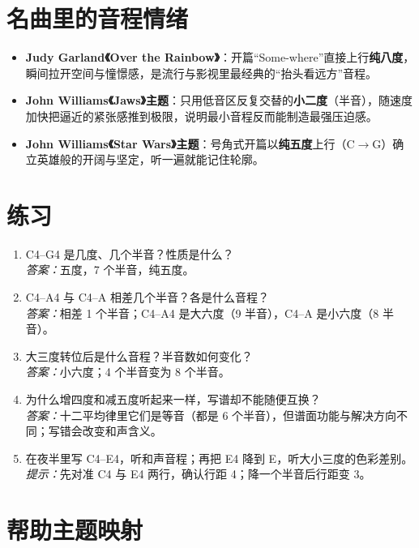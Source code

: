 \section{名曲里的音程情绪}

\begin{itemize}
  \item \textbf{Judy Garland《Over the Rainbow》}：开篇“Some-where”直接上行\textbf{纯八度}，瞬间拉开空间与憧憬感，是流行与影视里最经典的“抬头看远方”音程。
  \item \textbf{John Williams《Jaws》主题}：只用低音区反复交替的\textbf{小二度}（半音），随速度加快把逼近的紧张感推到极限，说明最小音程反而能制造最强压迫感。
  \item \textbf{John Williams《Star Wars》主题}：号角式开篇以\textbf{纯五度}上行（C$\rightarrow$G）确立英雄般的开阔与坚定，听一遍就能记住轮廓。
\end{itemize}

\section{练习}


\begin{exercise}
\begin{enumerate}
  \item C4–G4 是几度、几个半音？性质是什么？\\
  \emph{答案：}五度，7 个半音，纯五度。
  \item C4–A4 与 C4–A 相差几个半音？各是什么音程？\\
  \emph{答案：}相差 1 个半音；C4–A4 是大六度（9 半音），C4–A 是小六度（8 半音）。
  \item 大三度转位后是什么音程？半音数如何变化？\\
  \emph{答案：}小六度；4 个半音变为 8 个半音。
  \item 为什么增四度和减五度听起来一样，写谱却不能随便互换？\\
  \emph{答案：}十二平均律里它们是等音（都是 6 个半音），但谱面功能与解决方向不同；写错会改变和声含义。
  \item 在夜半里写 C4–E4，听和声音程；再把 E4 降到 E，听大小三度的色彩差别。\\
  \emph{提示：}先对准 C4 与 E4 两行，确认行距 4；降一个半音后行距变 3。
\end{enumerate}
\end{exercise}

\section{帮助主题映射}

